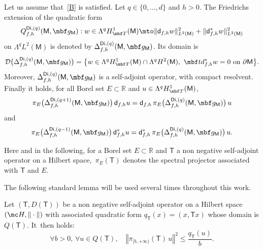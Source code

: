 \begin{proposition}\label{pr.defDfhD}
Let us assume that~\ref{B} is satisfied. Let $q\in \{0,\ldots,d\}$ and $h>0$. The Friedrichs extension of the quadratic form
\[
Q_{f,h}^{\mathsf{Di},(q)}(\mathsf M,\mbf g_{\mathsf M}): w\in \Lambda^qH^1_{\mbf T}(\mathsf M)\mto \Vert \mathsf d_{f,h}w \Vert_{L^2(\mathsf M)}^2 + \Vert\mathsf d_{f,h}^*w \Vert_{L^2(\mathsf M)}^2
\]
on $\Lambda^qL^2(\mathsf M)$
is denoted by $\Delta_{f,h}^{\mathsf{Di},(q)}(\mathsf M,\mbf g_{\mathsf M})$. Its domain is
\[
\mathcal D \bigl(\Delta_{f,h}^{\mathsf{Di},(q)}(\mathsf M,\mbf g_{\mathsf M})\bigr)=\big\{ w\in \Lambda^qH^1_{\mbf T}(\mathsf M)\cap\Lambda^qH^2(\mathsf M), \ \mbf
td^*_{f,h} w=0 \text{ on } \partial \mathsf M \big\}.
\]
Moreover, $\Delta^{\mathsf{Di},(q)}_{f,h}(\mathsf M,\mbf g_{\mathsf
M})$ is a self-adjoint operator, with compact resolvent. Finally it holds, for all Borel set $E\subset \mathbb R$ and $u\in \Lambda^qH^1_{\mbf T}(\mathsf M)$,
\begin{equation}\label{eq.complexeMM1}
\pi_{E}\bigl(\Delta_{f,h}^{\mathsf{Di},(q+1)}(\mathsf M,\mbf g_{\mathsf M})\bigr)\, \mathsf d_{f,h}u=\mathsf d_{f,h}\, \pi_{E}\bigl(\Delta_{f,h}^{\mathsf{Di},(q)}(\mathsf M,\mbf g_{\mathsf M})\bigr) \, u
\end{equation}
and
\begin{equation}\label{eq.complexeMM2}
\pi_{E}\bigl(\Delta_{f,h}^{\mathsf{Di},(q-1)}(\mathsf M,\mbf g_{\mathsf M})\bigr)\, \mathsf d_{f,h}^*u=\mathsf d_{f,h}^*\, \pi_{E}\bigl(\Delta_{f,h}^{\mathsf{Di},(q)}(\mathsf M,\mbf g_{\mathsf M}) \bigr)\, u.
\end{equation}
\end{proposition}

Here and in the following, for a Borel set $E\subset \mathbb R$ and
$\mathsf T$ a non negative self-adjoint operator on a Hilbert
space,~$\pi_{E}(\mathsf T)$ denotes the spectral projector associated
with $\mathsf T$ and $E$.

The following standard lemma will be used several times throughout this work.
\begin{lemma} \label{quadra}
Let $(\mathsf T,D\left (\mathsf T\right))$ be a non negative self-adjoint operator on a Hilbert space $\left(\mc H, \Vert\cdot\Vert\right)$ with associated quadratic form $q_{\mathsf T}(x)=(x,\mathsf Tx)$ whose domain is $Q\left (\mathsf T\right)$. It~then holds:
\[
\forall b>0, \, \forall u\in Q (\mathsf T), \quad \left\Vert \pi_{[b,+\infty)} (\mathsf T) \, u\right\Vert^2 \leq \frac{q_{\mathsf T}(u)}{b}.
\]
\end{lemma}

